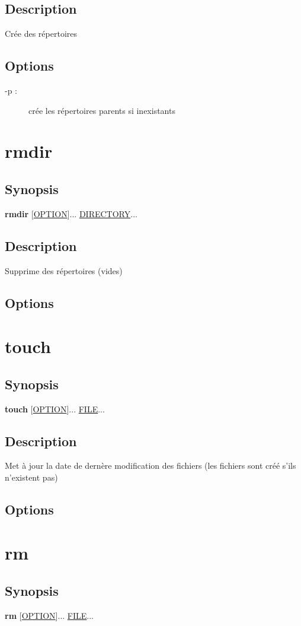 \documentclass[a4paper, 10pt, onecolumn, openright, oneside]{book}
\begin{document}
\subsection{Description}
Crée des répertoires
\subsection{Options}
\begin{description}
\item[-p :] crée les répertoires parents si inexistants
\end{description}

\section{rmdir}
\subsection{Synopsis}
\textbf{rmdir} [\ul{OPTION}]... \ul{DIRECTORY}...
\subsection{Description}
Supprime des répertoires (vides)
\subsection{Options}

\section{touch}
\subsection{Synopsis}
\textbf{touch} [\ul{OPTION}]... \ul{FILE}...
\subsection{Description}
Met à jour la date de dernère modification des fichiers (les fichiers sont créé s'ils n'existent pas)
\subsection{Options}

\section{rm}
\subsection{Synopsis}
\textbf{rm} [\ul{OPTION}]... \ul{FILE}...
\end{document}
